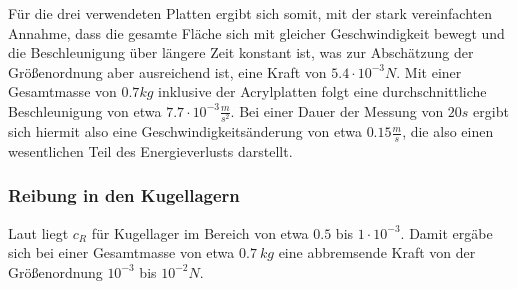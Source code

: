 Für die drei verwendeten Platten ergibt sich somit, mit der stark vereinfachten Annahme, dass die gesamte Fläche sich mit gleicher Geschwindigkeit bewegt und die Beschleunigung über längere Zeit konstant ist, was zur Abschätzung der Größenordnung aber ausreichend ist, eine Kraft von $ 5.4 \cdot 10^{-3}  N $. Mit einer Gesamtmasse von $0.7 kg$ inklusive der Acrylplatten folgt eine durchschnittliche Beschleunigung von etwa $ 7.7 \cdot 10^{-3} \frac{m}{s^2} $. Bei einer Dauer der Messung von $20 s$ ergibt sich hiermit also  eine Geschwindigkeitsänderung von etwa $ 0.15 \frac{m}{s} $, die also einen wesentlichen Teil des Energieverlusts darstellt. \\

\subsubsection{Reibung in den Kugellagern}
Laut \cite{wiki} liegt $ c_R $ für Kugellager im Bereich von etwa 
$ 0.5 $ bis $ 1 \cdot 10^{-3} $. 
Damit ergäbe sich bei einer Gesamtmasse von etwa $ 0.7 \  kg  $ eine abbremsende Kraft von der Größenordnung $ 10^{-3} $ bis $ 10^{-2} N $. 

